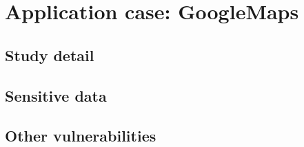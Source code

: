\newpage
\section{Application case: GoogleMaps}
\label{sec:google_maps}
	\subsection{Study detail}
	\subsection{Sensitive data}
	\subsection{Other vulnerabilities}